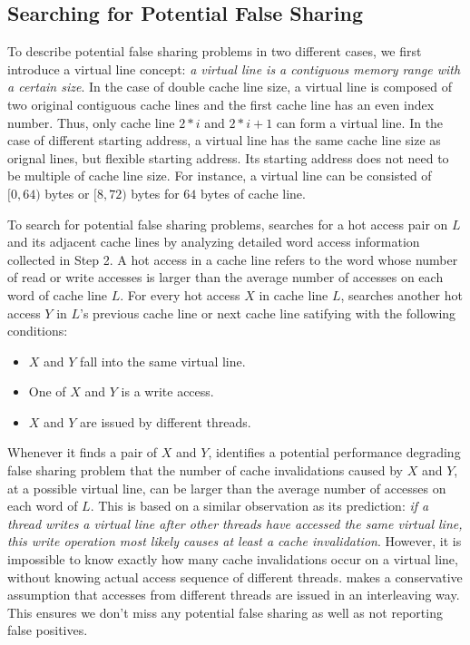 \subsection{Searching for Potential False Sharing}
\label{sec:evaluatingfs}
To describe potential false sharing problems in two different cases, 
we first introduce a virtual line concept:
{\it a virtual line is a contiguous memory range with a certain size}.
In the case of double cache line size, a virtual line 
is composed of two original 
contiguous cache lines and the first cache line has an even index number.
Thus, only cache line $2*i$ and $2*i+1$ can form a virtual line.
In the case of different starting address,
a virtual line has the same cache line size as orignal lines, but
flexible starting address.
Its starting address does not need to be multiple of cache line size.
For instance, a virtual line can be consisted of $[0,64)$ bytes or $[8,72)$ bytes 
for $64$ bytes of cache line.

To search for potential false sharing problems, 
\Predator{} searches for a hot access pair on $L$ and its adjacent cache lines 
by analyzing detailed word access information collected in Step 2. 
A hot access in a cache line refers to the word whose number of read or write accesses 
is larger than the average number of accesses on each word of cache line $L$.
For every hot access $X$ in cache line $L$, \Predator{} searches another
hot access $Y$ in $L$'s previous cache line or next cache line satifying with
the following conditions: 

\begin{itemize}
\item
$X$ and $Y$ fall into the same virtual line. 

\item
One of $X$ and $Y$ is a write access.

\item 
$X$ and $Y$ are issued by different threads.

\end{itemize}

Whenever it finds a pair of $X$ and $Y$, 
\Predator{} identifies a potential performance degrading false sharing problem
that the number of cache invalidations caused by $X$ and $Y$, at a possible virtual line, 
can be larger than the average number of accesses on each word of $L$. 
This is based on a similar observation as its prediction:
{\it if a thread writes a virtual line after other threads 
have accessed the same virtual line, this write operation most likely causes at least a cache 
invalidation}. 
However, it is impossible to know exactly how many cache invalidations occur on a virtual
line, without knowing actual access sequence of different threads.  
\Predator{} makes a conservative assumption that 
accesses from different threads are issued in an interleaving way.
This ensures we don't miss any potential false sharing as well as 
not reporting false positives.


